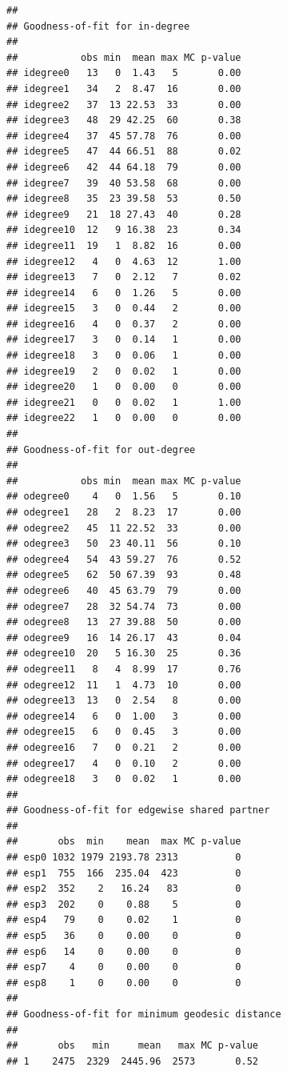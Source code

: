 \documentclass[]{book}
\begin{document}
\begin{verbatim}
## 
## Goodness-of-fit for in-degree 
## 
##           obs min  mean max MC p-value
## idegree0   13   0  1.43   5       0.00
## idegree1   34   2  8.47  16       0.00
## idegree2   37  13 22.53  33       0.00
## idegree3   48  29 42.25  60       0.38
## idegree4   37  45 57.78  76       0.00
## idegree5   47  44 66.51  88       0.02
## idegree6   42  44 64.18  79       0.00
## idegree7   39  40 53.58  68       0.00
## idegree8   35  23 39.58  53       0.50
## idegree9   21  18 27.43  40       0.28
## idegree10  12   9 16.38  23       0.34
## idegree11  19   1  8.82  16       0.00
## idegree12   4   0  4.63  12       1.00
## idegree13   7   0  2.12   7       0.02
## idegree14   6   0  1.26   5       0.00
## idegree15   3   0  0.44   2       0.00
## idegree16   4   0  0.37   2       0.00
## idegree17   3   0  0.14   1       0.00
## idegree18   3   0  0.06   1       0.00
## idegree19   2   0  0.02   1       0.00
## idegree20   1   0  0.00   0       0.00
## idegree21   0   0  0.02   1       1.00
## idegree22   1   0  0.00   0       0.00
## 
## Goodness-of-fit for out-degree 
## 
##           obs min  mean max MC p-value
## odegree0    4   0  1.56   5       0.10
## odegree1   28   2  8.23  17       0.00
## odegree2   45  11 22.52  33       0.00
## odegree3   50  23 40.11  56       0.10
## odegree4   54  43 59.27  76       0.52
## odegree5   62  50 67.39  93       0.48
## odegree6   40  45 63.79  79       0.00
## odegree7   28  32 54.74  73       0.00
## odegree8   13  27 39.88  50       0.00
## odegree9   16  14 26.17  43       0.04
## odegree10  20   5 16.30  25       0.36
## odegree11   8   4  8.99  17       0.76
## odegree12  11   1  4.73  10       0.00
## odegree13  13   0  2.54   8       0.00
## odegree14   6   0  1.00   3       0.00
## odegree15   6   0  0.45   3       0.00
## odegree16   7   0  0.21   2       0.00
## odegree17   4   0  0.10   2       0.00
## odegree18   3   0  0.02   1       0.00
## 
## Goodness-of-fit for edgewise shared partner 
## 
##       obs  min    mean  max MC p-value
## esp0 1032 1979 2193.78 2313          0
## esp1  755  166  235.04  423          0
## esp2  352    2   16.24   83          0
## esp3  202    0    0.88    5          0
## esp4   79    0    0.02    1          0
## esp5   36    0    0.00    0          0
## esp6   14    0    0.00    0          0
## esp7    4    0    0.00    0          0
## esp8    1    0    0.00    0          0
## 
## Goodness-of-fit for minimum geodesic distance 
## 
##       obs   min     mean   max MC p-value
## 1    2475  2329  2445.96  2573       0.52

\end{verbatim}
\end{document}
